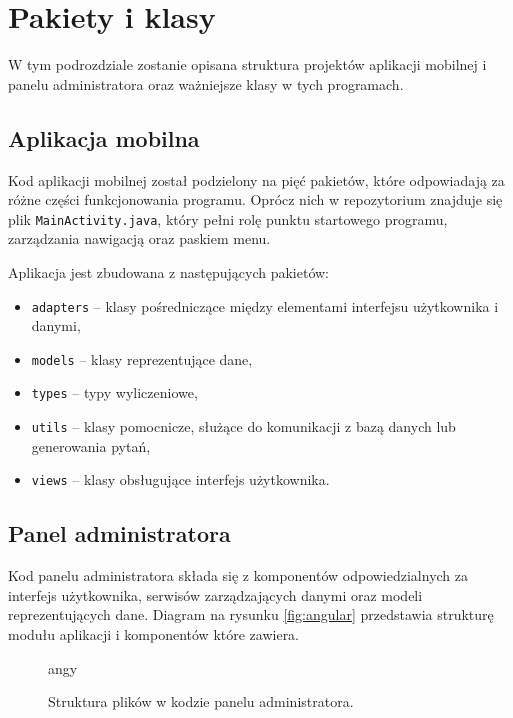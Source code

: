 \documentclass[a4paper,twoside,12pt]{book}
\begin{document}
\section{Pakiety i klasy}

W tym podrozdziale zostanie opisana struktura projektów aplikacji mobilnej i panelu administratora oraz ważniejsze klasy w tych programach.

\subsection{Aplikacja mobilna}

Kod aplikacji mobilnej został podzielony na pięć pakietów, które odpowiadają za różne części funkcjonowania programu. Oprócz nich w repozytorium znajduje się plik \texttt{MainActivity.java}, który pełni rolę punktu startowego programu, zarządzania nawigacją oraz paskiem menu. 

Aplikacja jest zbudowana z następujących pakietów:
\begin{itemize}
\item \texttt{adapters} -- klasy pośredniczące między elementami interfejsu użytkownika i danymi,
\item \texttt{models} -- klasy reprezentujące dane,
\item \texttt{types} -- typy wyliczeniowe,
\item \texttt{utils} -- klasy pomocnicze, służące do komunikacji z bazą danych lub generowania pytań,
\item \texttt{views} -- klasy obsługujące interfejs użytkownika.
\end{itemize}



\subsection{Panel administratora}

Kod panelu administratora składa się z komponentów odpowiedzialnych za interfejs użytkownika, serwisów zarządzających danymi oraz modeli reprezentujących dane. Diagram na rysunku \ref{fig:angular} przedstawia strukturę modułu aplikacji i komponentów które zawiera.

\begin{figure}
angy
\caption{Struktura plików w kodzie panelu administratora.}
\label{fig:dirtree}
\end{figure}
\end{document}
